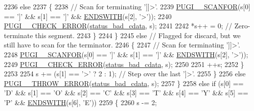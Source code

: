 \begin{DoxyCode}
2236                         \textcolor{keywordflow}{else}
2237                         \{
2238                             \textcolor{comment}{// Scan for terminating ']]>'.}
2239                             \hyperlink{pugixml_8cpp_a98386e86f2c7e7e477939d209a5bbf7e}{PUGI\_\_SCANFOR}(s[0] == \textcolor{charliteral}{']'} && s[1] == \textcolor{charliteral}{']'} && 
      \hyperlink{pugixml_8cpp_a3a72d0b2c0e7f99940ce8fbcc69e532f}{ENDSWITH}(s[2], \textcolor{charliteral}{'>'}));
2240                             \hyperlink{pugixml_8cpp_a03531d9b3c74f0843567257537edfd53}{PUGI\_\_CHECK\_ERROR}(\hyperlink{namespacepugi_a9054ca609e12afb8f3e5892fc6c0b555aa2ebdaf5e8bf5414bec3004270e102b8}{status\_bad\_cdata}, s);
2241 
2242                             *s++ = 0; \textcolor{comment}{// Zero-terminate this segment.}
2243                         \}
2244                     \}
2245                     \textcolor{keywordflow}{else} \textcolor{comment}{// Flagged for discard, but we still have to scan for the terminator.}
2246                     \{
2247                         \textcolor{comment}{// Scan for terminating ']]>'.}
2248                         \hyperlink{pugixml_8cpp_a98386e86f2c7e7e477939d209a5bbf7e}{PUGI\_\_SCANFOR}(s[0] == \textcolor{charliteral}{']'} && s[1] == \textcolor{charliteral}{']'} && 
      \hyperlink{pugixml_8cpp_a3a72d0b2c0e7f99940ce8fbcc69e532f}{ENDSWITH}(s[2], \textcolor{charliteral}{'>'}));
2249                         \hyperlink{pugixml_8cpp_a03531d9b3c74f0843567257537edfd53}{PUGI\_\_CHECK\_ERROR}(\hyperlink{namespacepugi_a9054ca609e12afb8f3e5892fc6c0b555aa2ebdaf5e8bf5414bec3004270e102b8}{status\_bad\_cdata}, s);
2250 
2251                         ++s;
2252                     \}
2253 
2254                     s += (s[1] == \textcolor{charliteral}{'>'} ? 2 : 1); \textcolor{comment}{// Step over the last ']>'.}
2255                 \}
2256                 \textcolor{keywordflow}{else} \hyperlink{pugixml_8cpp_a8af02d87a10272f03f96ab93a96d7202}{PUGI\_\_THROW\_ERROR}(\hyperlink{namespacepugi_a9054ca609e12afb8f3e5892fc6c0b555aa2ebdaf5e8bf5414bec3004270e102b8}{status\_bad\_cdata}, s);
2257             \}
2258             \textcolor{keywordflow}{else} \textcolor{keywordflow}{if} (s[0] == \textcolor{charliteral}{'D'} && s[1] == \textcolor{charliteral}{'O'} && s[2] == \textcolor{charliteral}{'C'} && s[3] == \textcolor{charliteral}{'T'} && s[4] == \textcolor{charliteral}{'Y'} && s[5] == \textcolor{charliteral}{'P'}
       && \hyperlink{pugixml_8cpp_a3a72d0b2c0e7f99940ce8fbcc69e532f}{ENDSWITH}(s[6], \textcolor{charliteral}{'E'}))
2259             \{
2260                 s -= 2;

\end{DoxyCode}
